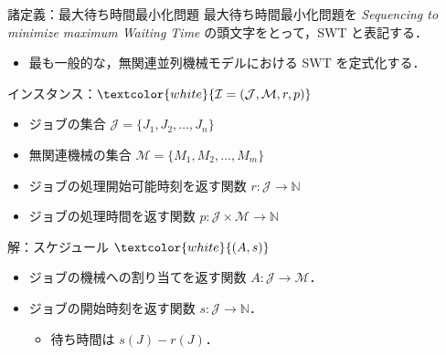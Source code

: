 \documentclass[dvipdfmx]{beamer}
\begin{document}
    \begin{frame}{諸定義：最大待ち時間最小化問題}
      最大待ち時間最小化問題を {\it \alert{S}equencing to minimize maximum \alert{W}aiting \alert{T}ime} の頭文字をとって，\alert{SWT} と表記する．
      \begin{itemize}
        \item 最も一般的な，無関連並列機械モデルにおける SWT を定式化する．
      \end{itemize}
      \begin{block}{インスタンス：$\textcolor{white}{\mathcal{I} = (\mathcal{J}, \mathcal{M}, r, p)}$}
        \begin{itemize}
          \item {ジョブの集合 $\mathcal{J} = \{J_1,J_2,\ldots,J_n\}$}
          \item {無関連機械の集合 $\mathcal{M} = \{M_1,M_2,\ldots,M_m\}$}
          \item {ジョブの処理開始可能時刻を返す関数 $r : \mathcal{J} \to \mathbb{N}$}
          \item {ジョブの処理時間を返す関数 $p : \mathcal{J} \times \mathcal{M} \to \mathbb{N}$}
        \end{itemize}
      \end{block}
      \begin{block}{解：スケジュール $\textcolor{white}{(A,s)}$}
        \begin{itemize}
          \item ジョブの機械への割り当てを返す関数 $A : \mathcal{J} \to \mathcal{M}$．
          \item ジョブの開始時刻を返す関数 $s : \mathcal{J} \to \mathbb{N}$．
          \begin{itemize}
            \item 待ち時間は $s(J) - r(J)$．
          \end{itemize}
        \end{itemize}
      \end{block}
    \end{frame}
\end{document}
